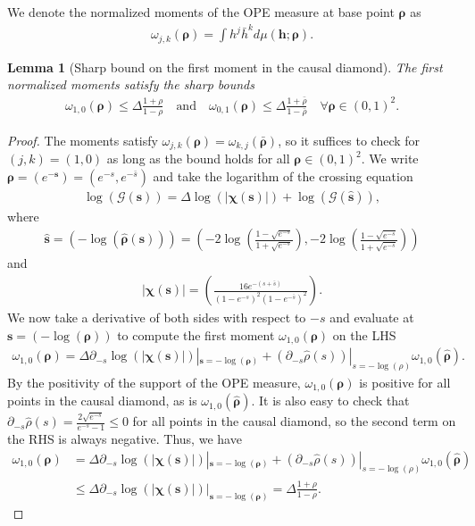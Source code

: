 \documentclass[10pt,a4paper]{amsart}
\newtheorem{lem}{Lemma}
\newcommand{\De}{\Delta}
\newcommand{\ba}{\begin{equation} \begin{aligned}}
\newcommand{\bs}[1]{\boldsymbol{#1}}
\newcommand{\ea}{\end{aligned} \end{equation}}
\newcommand{\rhob}{{\bar{\rho}}}
\newcommand{\bh}{{\bar{h}}}
\begin{document}
We denote the normalized moments of the OPE measure at base point $\bs{\rho}$ as
\ba
\omega_{j,k}(\bs{\rho}) = \int h^j \bh^k d\mu(\bs{h};\bs{\rho}).
\ea

\begin{lem}[Sharp bound on the first moment in the causal diamond]
\label{sharpmomentbound}
The first normalized moments satisfy the sharp bounds
\ba
\omega_{1,0}(\bs{\rho}) \leq \De \frac{1+\rho}{1-\rho} \quad \text{and} \quad \omega_{0,1}(\bs{\rho}) \leq \De \frac{1+\rhob}{1-\rhob} \quad \forall \bs{\rho} \in (0,1)^2.
\ea
\end{lem}

\begin{proof}
The moments satisfy $\omega_{j,k}(\bs{\rho}) = \omega_{k,j}(\bar{\bs{\rho}})$, so it suffices to check for $(j,k) = (1,0)$ as long as the bound holds for all $\bs{\rho} \in (0,1)^2$. We write $\bs{\rho} = (e^{-\bs{s}}) = (e^{-s},e^{-\bar{s}})$ and take the logarithm of the crossing equation
\ba
\log(\mathcal{G}(\bs{s})) = \De \log(|\bs{\chi}(\bs{s})|) + \log( \mathcal{G}( \hat{\bs{s}} )),
\ea
where 
\ba
\hat{\bs{s}} = \left(- \log(\hat{\bs{\rho}}(\bs{s}))\right) = \left(- 2 \log\left(\frac{1-\sqrt{e^{-s}}}{1+\sqrt{e^{-s}}}\right) ,- 2 \log\left(\frac{1-\sqrt{e^{-\bar{s}}}}{1+\sqrt{e^{-\bar{s}}}}\right) \right)
\ea
and 
\ba
|\bs{\chi}(\bs{s})| = \left(  \frac{16 e^{-(s+\bar{s})}}{(1-e^{-s})^2 (1-e^{-\bar{s}})^2}\right).
\ea
We now take a derivative of both sides with respect to $-s$ and evaluate at $\bs{s} = \left(-\log(\bs{\rho}) \right)$ to compute the first moment $\omega_{1,0}(\bs{\rho})$ on the LHS
\ba
\omega_{1,0}(\bs{\rho}) = \De \partial_{-s} \log(|\bs{\chi}(\bs{s})|)|_{\bs{s} = -\log(\bs{\rho})} + \left(\partial_{-s} \hat{\rho}(s) \right)|_{s = -\log(\rho)} \omega_{1,0}(\hat{\bs{\rho}}).
\ea
By the positivity of the support of the OPE measure, $\omega_{1,0}(\bs{\rho})$ is positive for all points in the causal diamond, as is $\omega_{1,0}(\hat{\bs{\rho}})$. It is also easy to check that $\partial_{-s} \hat{\rho}(s) = \frac{2 \sqrt{e^{-s}}}{e^{-s} -1} \leq 0$ for all points in the causal diamond, so the second term on the RHS is always negative. Thus, we have
\ba
\omega_{1,0}(\bs{\rho}) &= \De \partial_{-s} \log(|\bs{\chi}(\bs{s})|)|_{\bs{s} = -\log(\bs{\rho})} + \left(\partial_{-s} \hat{\rho}(s) \right)|_{s = -\log(\rho)} \omega_{1,0}(\hat{\bs{\rho}})\\& \leq \De \partial_{-s} \log(|\bs{\chi}(\bs{s})|)|_{\bs{s} = -\log(\bs{\rho})}  = \De \frac{1+\rho}{1-\rho}.
\ea
\end{proof}
\end{document}
